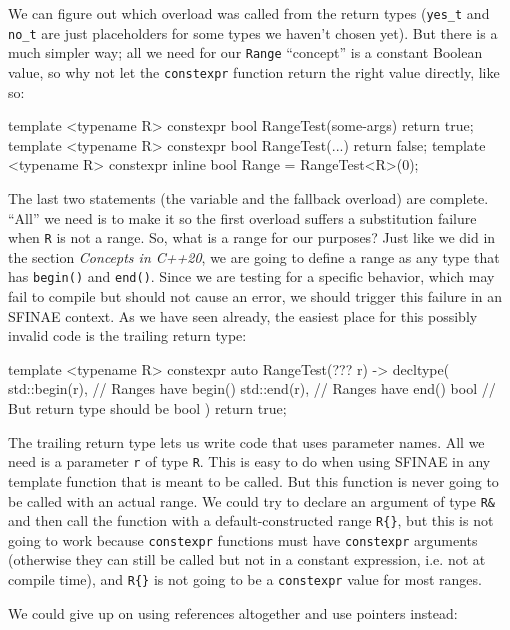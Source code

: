 We can figure out which overload was called from the return types (\texttt{yes\_t} and \texttt{no\_t} are just placeholders for some types we haven't chosen yet). But there is a much simpler way; all we need for our \texttt{Range} ``concept'' is a constant Boolean value, so why not let the \texttt{constexpr} function return the right value directly, like so:

\begin{code}
template <typename R> constexpr bool RangeTest(some-args) {
  return true;
}
template <typename R> constexpr bool RangeTest(...) {
  return false;
}
template <typename R>
constexpr inline bool Range = RangeTest<R>(0);
\end{code}

The last two statements (the variable and the fallback overload) are complete. ``All'' we need is to make it so the first overload suffers a substitution failure when \texttt{R} is not a range. So, what is a range for our purposes? Just like we did in the section \emph{Concepts in C++20}, we are going to define a range as any type that has \texttt{begin()} and \texttt{end()}. Since we are testing for a specific behavior, which may fail to compile but should not cause an error, we should trigger this failure in an SFINAE context. As we have seen already, the easiest place for this possibly invalid code is the trailing return type:

\begin{code}
template <typename R>
constexpr auto RangeTest(??? r) -> decltype(
  std::begin(r),        // Ranges have begin()
  std::end(r),         // Ranges have end()
  bool{}            // But return type should be bool
) { return true; }
\end{code}

The trailing return type lets us write code that uses parameter names. All we need is a parameter \texttt{r} of type \texttt{R}. This is easy to do when using SFINAE in any template function that is meant to be called. But this function is never going to be called with an actual range. We could try to declare an argument of type \texttt{R\&} and then call the function with a default-constructed range \texttt{R\{\}}, but this is not going to work because \texttt{constexpr} functions must have \texttt{constexpr} arguments (otherwise they can still be called but not in a constant expression, i.e. not at compile time), and \texttt{R\{\}} is not going to be a \texttt{constexpr} value for most ranges.

We could give up on using references altogether and use pointers instead:

